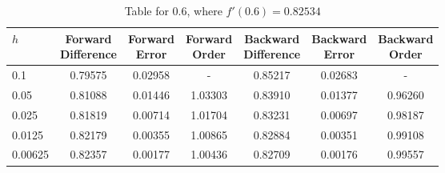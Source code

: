 \begin{table}
\centering
\caption{Table for 0.6, where $f'(0.6) = 0.82534$}
\begin{tabular}{lcccccc}
\toprule
    $h$ & \makecell{Forward \\ Difference} & \makecell{Forward \\ Error} & \makecell{Forward \\ Order} & \makecell{Backward \\ Difference} & \makecell{Backward \\ Error} & \makecell{Backward \\ Order} \\
\midrule
    0.1 &                          0.79575 &                     0.02958 &                           - &                           0.85217 &                      0.02683 &                            - \\
   0.05 &                          0.81088 &                     0.01446 &                     1.03303 &                           0.83910 &                      0.01377 &                      0.96260 \\
  0.025 &                          0.81819 &                     0.00714 &                     1.01704 &                           0.83231 &                      0.00697 &                      0.98187 \\
 0.0125 &                          0.82179 &                     0.00355 &                     1.00865 &                           0.82884 &                      0.00351 &                      0.99108 \\
0.00625 &                          0.82357 &                     0.00177 &                     1.00436 &                           0.82709 &                      0.00176 &                      0.99557 \\
\bottomrule
\end{tabular}
\end{table}
